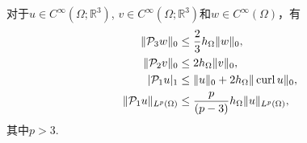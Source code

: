 \begin{lemma}
对于$u\in C^{\infty}(\Omega;\mathbb R^3)$, $v\in C^{\infty}(\Omega;\mathbb R^3)$和$w\in C^{\infty}(\Omega)$，有
\begin{align}
\label{poincareP3bound}
\|\mathcal{P}_3w\|_0&\leq \frac{2}{3}h_{\Omega}\|w\|_0, \\
\label{poincareP2bound}
\|\mathcal{P}_2v\|_0&\leq 2h_{\Omega}\|v\|_0, \\
\label{poincareP1bound}
|\mathcal{P}_1u|_{1}&\leq \|u\|_0+2h_{\Omega}\|\operatorname{curl} u\|_0, \\
\label{poincareP1boundLp}
\|\mathcal{P}_1u\|_{L^p(\Omega)}&\leq \frac{p}{(p-3)}h_{\Omega}\|u\|_{L^p(\Omega)},
\end{align}
其中$p>3$.
\end{lemma}
